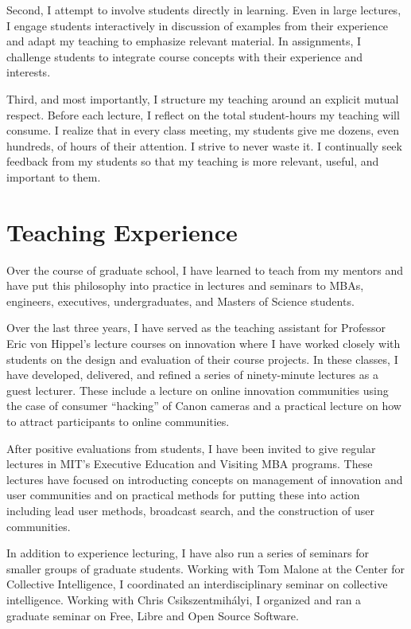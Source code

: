 \documentclass[10pt]{memoir}
\begin{document}
Second, I attempt to involve students directly in learning. Even in
large lectures, I engage students interactively in discussion of
examples from their experience and adapt my teaching to emphasize
relevant material. In assignments, I challenge students to integrate
course concepts with their experience and interests.

Third, and most importantly, I structure my teaching around an
explicit mutual respect. Before each lecture, I reflect on the total
student-hours my teaching will consume. I realize that in every class
meeting, my students give me dozens, even hundreds, of hours of their
attention. I strive to never waste it. I continually seek feedback
from my students so that my teaching is more relevant, useful, and
important to them.

\section{Teaching Experience}

Over the course of graduate school, I have learned to teach from my
mentors and have put this philosophy into practice in lectures and
seminars to MBAs, engineers, executives, undergraduates, and Masters
of Science students.

Over the last three years, I have served as the teaching assistant for
Professor Eric von Hippel's lecture courses on innovation where I have
worked closely with students on the design and evaluation of their
course projects. In these classes, I have developed, delivered, and
refined a series of ninety-minute lectures as a guest lecturer. These
include a lecture on online innovation communities using the case of
consumer ``hacking'' of Canon cameras and a practical lecture on how
to attract participants to online communities.

After positive evaluations from students, I have been invited to give
regular lectures in MIT's Executive Education and Visiting MBA
programs. These lectures have focused on introducting concepts on
management of innovation and user communities and on practical methods
for putting these into action including lead user methods, broadcast
search, and the construction of user communities.

In addition to experience lecturing, I have also run a series of
seminars for smaller groups of graduate students. Working with Tom
Malone at the Center for Collective Intelligence, I coordinated an
interdisciplinary seminar on collective intelligence. Working with
Chris Csikszentmihályi, I organized and ran a graduate seminar on
Free, Libre and Open Source Software.
\end{document}
